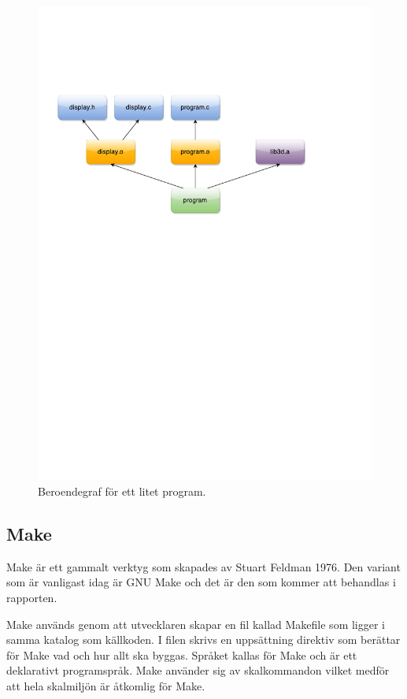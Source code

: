 \begin{figure}[h!]
  \centering
  \includegraphics[trim=0 350 0 120, clip]{yngve-tex/grafik/beroendegraf.pdf}
  \caption{Beroendegraf för ett litet program.}
  \label{fig:beroendegraf}
\end{figure}

\subsection{Make}
Make är ett gammalt verktyg som skapades av Stuart Feldman 1976. Den variant som är vanligast idag är GNU Make och det är den som kommer att behandlas i rapporten.

Make används genom att utvecklaren skapar en fil kallad Makefile som ligger i samma katalog som källkoden. I filen skrivs en uppsättning direktiv som berättar för Make vad och hur allt ska byggas. Språket kallas för Make och är ett deklarativt programspråk. Make använder sig av skalkommandon vilket medför att hela skalmiljön är åtkomlig för Make.

